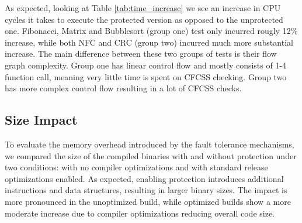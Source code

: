 As expected, looking at Table \ref{tab:time_increase} we see an increase in CPU cycles it takes to execute the protected version as opposed to the unprotected one. Fibonacci, Matrix and Bubblesort (group one) test only incurred rougly 12\% increase, while both NFC and CRC (group two) incurred much more substantial increase. The main difference between these two groups of tests is their flow graph complexity. Group one has linear control flow and mostly consists of 1-4 function call, meaning very little time is spent on CFCSS checking. Group two has more complex control flow resulting in a lot of CFCSS checks.




\subsection{Size Impact}

To evaluate the memory overhead introduced by the fault tolerance mechanisms, we compared the size of the compiled binaries with and without protection under two conditions: with no compiler optimizations and with standard release optimizations enabled. As expected, enabling protection introduces additional instructions and data structures, resulting in larger binary sizes. The impact is more pronounced in the unoptimized build, while optimized builds show a more moderate increase due to compiler optimizations reducing overall code size.

